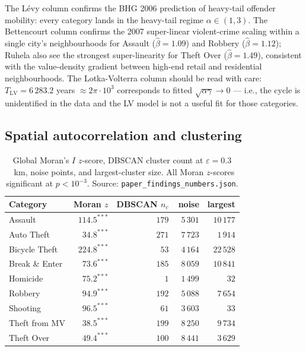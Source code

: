 \documentclass[11pt,a4paper]{article}
\newcommand{\1}{\mathbf{1}}
\theoremstyle{plain}
\theoremstyle{definition}
\begin{document}
The Lévy column confirms the BHG 2006 \cite{brockmann2006bhg}
prediction of heavy-tail offender mobility: every category lands in
the heavy-tail regime $\alpha \in (1,3)$.  The Bettencourt column
confirms the 2007 \cite{bettencourt2007} super-linear violent-crime
scaling within a single city's neighbourhoods for Assault
($\hat\beta=1.09$) and Robbery ($\hat\beta=1.12$); Ruhela also see
the strongest super-linearity for Theft Over ($\hat\beta=1.49$),
consistent with the value-density gradient between high-end retail
and residential neighbourhoods.  The Lotka-Volterra column should be
read with care: $T_{\mathrm{LV}} = 6\,283.2$ years
$\approx 2\pi\cdot 10^3$ corresponds to fitted
$\sqrt{\alpha\gamma} \to 0$ — i.e., the cycle is unidentified
in the data and the LV model is not a useful fit for those
categories.

\subsection{Spatial autocorrelation and clustering}\label{sec:spatial}

\begin{table}[h]
\centering\footnotesize
\caption{Global Moran's $I$ $z$-score, DBSCAN cluster count at
$\varepsilon=0.3$~km, noise points, and largest-cluster size.  All
Moran $z$-scores significant at $p<10^{-3}$.  Source:
\texttt{paper\_findings\_numbers.json}.}\label{tab:spatial}
\begin{tabular}{lrrrr}
\toprule
Category & Moran $z$ & DBSCAN $n_c$ & noise & largest\\\midrule
Assault       & $114.5^{\ast\ast\ast}$ & $179$ & $\phantom{0}5\,301$ & $10\,177$\\
Auto Theft    & $\phantom{0}34.8^{\ast\ast\ast}$ & $271$ & $\phantom{0}7\,723$ & $\phantom{0}1\,914$\\
Bicycle Theft & $224.8^{\ast\ast\ast}$ & $\phantom{0}53$ & $\phantom{0}4\,164$ & $22\,528$\\
Break \& Enter& $\phantom{0}73.6^{\ast\ast\ast}$ & $185$ & $\phantom{0}8\,059$ & $10\,841$\\
Homicide      & $\phantom{0}75.2^{\ast\ast\ast}$ & $\phantom{00}1$ & $\phantom{0}1\,499$ & $\phantom{00\,0}32$\\
Robbery       & $\phantom{0}94.9^{\ast\ast\ast}$ & $192$ & $\phantom{0}5\,088$ & $\phantom{0}7\,654$\\
Shooting      & $\phantom{0}96.5^{\ast\ast\ast}$ & $\phantom{0}61$ & $\phantom{0}3\,603$ & $\phantom{00\,5}33$\\
Theft from MV & $\phantom{0}38.5^{\ast\ast\ast}$ & $199$ & $\phantom{0}8\,250$ & $\phantom{0}9\,734$\\
Theft Over    & $\phantom{0}49.4^{\ast\ast\ast}$ & $100$ & $\phantom{0}8\,441$ & $\phantom{0}3\,629$\\
\bottomrule
\end{tabular}
\end{table}
\end{document}
